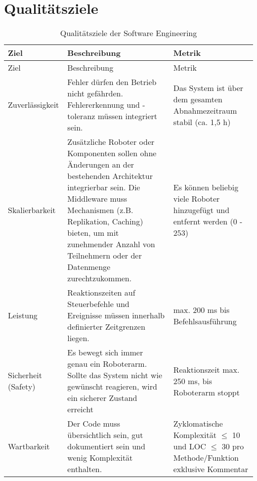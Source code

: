 \newpage
\section{Qualitätsziele}
\begin{longtable}{|>{\raggedright\arraybackslash}p{4cm}|>{\raggedright\arraybackslash}p{5cm}|>{\raggedright\arraybackslash}p{5cm}|}
	\caption{Qualitätsziele der Software Engineering} \label{tab:seziele} \\
	\hline
	Ziel & Beschreibung & Metrik \\
	\hline
	\endfirsthead
	
	\hline
	Ziel & Beschreibung & Metrik \\
	\hline
	\endhead
	
	\hline
	\endfoot
	
	
	Zuverlässigkeit & 
	Fehler dürfen den Betrieb nicht gefährden. Fehlererkennung und -toleranz müssen integriert sein.
	& Das System ist über dem gesamten Abnahmezeitraum stabil (ca. 1,5 h)
	\\
	\hline
	Skalierbarkeit & 
	Zusätzliche Roboter oder Komponenten sollen ohne Änderungen an der bestehenden Architektur integrierbar sein. Die Middleware muss Mechanismen (z.B. Replikation, Caching) bieten, um mit zunehmender Anzahl von Teilnehmern oder der Datenmenge zurechtzukommen.
	& Es können beliebig viele Roboter hinzugefügt und entfernt werden (0 - 253)
	\\
	\hline
	Leistung & 
	Reaktionszeiten auf Steuerbefehle und Ereignisse müssen innerhalb definierter Zeitgrenzen liegen. 
	& max. 200 ms bis Befehlsausführung
	\\
	\hline
	Sicherheit (Safety) & 
	Es bewegt sich immer genau ein Roboterarm. Sollte das System nicht wie gewünscht reagieren, wird ein sicherer Zustand erreicht
	& Reaktionszeit max. 250 ms, bis Roboterarm stoppt
	\\
	\hline
	Wartbarkeit & 
	Der Code muss übersichtlich sein, gut dokumentiert sein und wenig Komplexität enthalten. 
	& Zyklomatische Komplexität $\leq$ 10 und LOC $\leq$ 30 pro Methode/Funktion exklusive Kommentar  
	
	\\
	\hline
	

\end{longtable}
